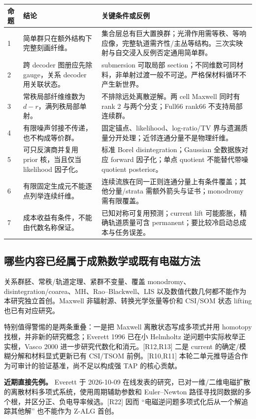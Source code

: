 \begin{longtable}{p{}p{}p{}}
\toprule 命题 & 结论 & 关键条件或反例\\\midrule\endhead
1 & 简单群只在额外结构下完整刻画纤维。 & 集合层总有巨大置换群；光滑作用需等秩、等响应像，完整轨道需齐性/主丛等结构。三次实映射与自交浸入反例否定通用简单群。\\
2 & 跨 decoder 图册应先除 gauge，关系 decoder 用关联状态。 & submersion 可取局部 section；不同维数可同材料，非单射过渡一般不可逆。严格保材料循环不产生新世界。\\
3 & 常秩局部纤维维数为 $d-r$，满列秩局部单射。 & 不排除远处离散逆解。两 cell Maxwell 同时有 rank 2 与两个分支；Full66 rank66 不支持局部连续群。\\
4 & 有限噪声邻接不传递，也不构成等价群。 & 固定锚点、likelihood、log-ratio/TV 界与遗漏质量分开处理；近邻连通分量不是物理纤维。\\
5 & 可只反演商并复用 prior 核，当且仅当 likelihood 因子化。 & 标准 Borel disintegration；Gaussian 全数据族对应 forward 因子化；单点 quotient 不能替代带噪 quotient posterior。\\
6 & 有限固定生成元不能逐点列举连续纤维。 & 连续流族在同一正则连通分量上有条件覆盖；其他分量/strata 需额外箭头与证书；monodromy 需有限覆盖。\\
7 & 成本收益有条件，不能由代数名称保证。 & 已知对称可复用预测；current lift 可能膨胀，精确轨道质量可含 permanent；要比较冷启动总成本与任务误差。\\\bottomrule
\end{longtable}

\subsection{哪些内容已经属于成熟数学或既有电磁方法}

关系群胚、常秩/轨道定理、紧群不变量、覆盖 monodromy、disintegration/coarea、MH、Rao--Blackwell、LIS 以及数值代数几何都不能作为本研究独立首创。Maxwell 非辐射源、转换光学张量等价和 CSI/SOM 状态 lifting 也已有对应研究。

特别值得警惕的是两条重叠：一是把 Maxwell 离散状态写成多项式并用 homotopy 找根，并非新的研究概念；Everett 1996 已在小 Helmholtz 逆问题中实际枚举正实根，Vasco 2000 进一步研究代数化和消元。[R12,R13] 二是 current 的确定/模糊分解和材料显式更新已有 CSI/TSOM 前例。[R10,R11] 本轮二单元推导适合作为可审计的验证基准，尚不足以构成强 TAP 的核心贡献。

\textbf{近期直接先例。} Everett 于 2026-10-09 在线发表的研究，已对一维/二维电磁扩散的离散材料多项式系统，使用周期辅助参数和 Euler--Newton 路径寻找同数据的多个根，并区分正、负电导率候选。[R22] 因而 ``电磁逆问题多项式化后从一个解追踪其他解'' 也不能作为 Z-ALG 首创。

